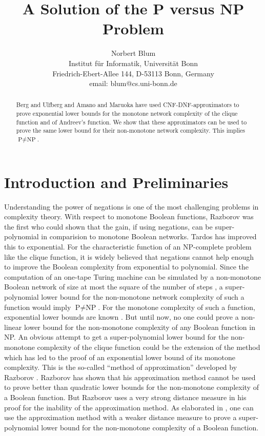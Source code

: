 \documentclass[11pt]{article}
\title{A Solution of the P versus NP Problem}
\author{Norbert Blum \\
        Institut f\"ur Informatik, Universit\"at Bonn \\    Friedrich-Ebert-Allee 144,
D-53113 Bonn, Germany \\
email: blum@cs.uni-bonn.de}
\begin{document}
\maketitle

\begin{abstract}
  Berg and Ulfberg \cite{BeUl} and Amano and Maruoka \cite{AmMa} have used CNF-DNF-approximators
  to prove exponential lower bounds for the monotone network complexity of the clique function and of
  Andreev's function. We show that these approximators can be used to prove the same lower bound for
  their non-monotone network complexity. This implies $\mbox{P} \not= \mbox{NP}$. 
\end{abstract}


\section{Introduction and Preliminaries}

Understanding the power of negations is one of the most challenging problems in complexity
theory. With respect to monotone Boolean functions, Razborov \cite{Ra3} was the first who could shown
that the gain, if using negations, can be super-polynomial in comparision to monotone Boolean networks.
Tardos \cite{Ta} has improved this to exponential.
For the characteristic function of an NP-complete problem like the clique function,
it is widely believed that negations cannot help enough to improve the Boolean complexity from
exponential to polynomial. Since the computation of an one-tape Turing machine can be simulated
by a non-monotone Boolean network of size at most the square of the number of steps \cite[Ch. 3.9]{Sa},
a super-polynomial lower bound for the non-monotone network complexity of such a function would imply
$\mbox{P} \not= \mbox{NP}$. For the monotone complexity of such a function, exponential lower
bounds are known \cite{Ra1,An,AlBo,Ka,Ha,Ju,BeUl,AmMa,HaRa}. But until now, no one could prove a non-linear
lower bound for the non-monotone complexity of any Boolean function in NP. An obvious attempt to
get a super-polynomial lower bound for the non-monotone complexity of the clique function could
be the extension of the method which has led to the proof of an exponential lower bound of its
monotone complexity. This is the so-called ``method of approximation'' developed by
Razborov \cite{Ra1}. Razborov \cite{Ra2} has shown that his approximation method cannot be used
to prove better than quadratic lower bounds for the non-monotone complexity of a Boolean function.
But Razborov uses a very strong distance measure in his proof for the inability of the approximation
method. As elaborated in \cite{Bl}, one can use the approximation method with a weaker distance measure
to prove a super-polynomial lower bound for the non-monotone complexity of a Boolean function. 
\end{document}
